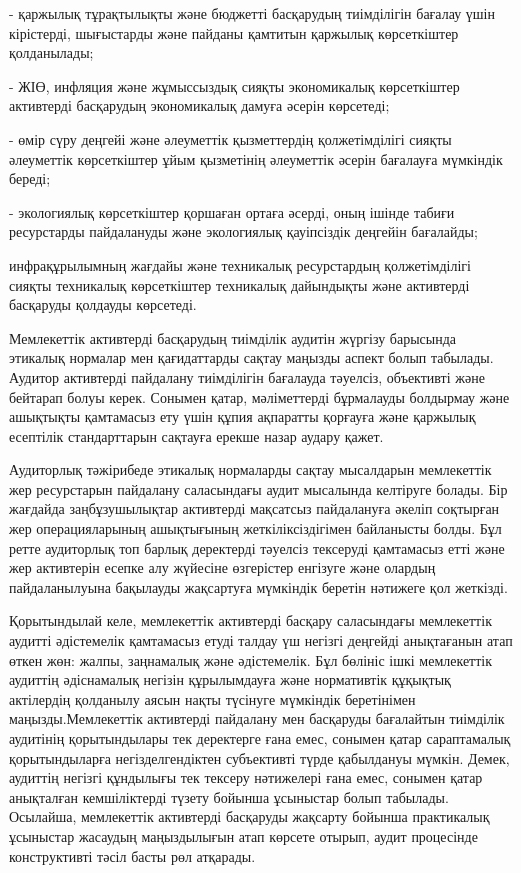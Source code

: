 - қаржылық тұрақтылықты және бюджетті басқарудың тиімділігін бағалау
үшін кірістерді, шығыстарды және пайданы қамтитын қаржылық көрсеткіштер
қолданылады;

- ЖІӨ, инфляция және жұмыссыздық сияқты экономикалық көрсеткіштер
активтерді басқарудың экономикалық дамуға әсерін көрсетеді;

- өмір сүру деңгейі және әлеуметтік қызметтердің қолжетімділігі сияқты
әлеуметтік көрсеткіштер ұйым қызметінің әлеуметтік әсерін бағалауға
мүмкіндік береді;

- экологиялық көрсеткіштер қоршаған ортаға әсерді, оның ішінде табиғи
ресурстарды пайдалануды және экологиялық қауіпсіздік деңгейін бағалайды;

инфрақұрылымның жағдайы және техникалық ресурстардың қолжетімділігі
сияқты техникалық көрсеткіштер техникалық дайындықты және активтерді
басқаруды қолдауды көрсетеді.

Мемлекеттік активтерді басқарудың тиімділік аудитін жүргізу барысында
этикалық нормалар мен қағидаттарды сақтау маңызды аспект болып табылады.
Аудитор активтерді пайдалану тиімділігін бағалауда тәуелсіз, объективті
және бейтарап болуы керек. Сонымен қатар, мәліметтерді бұрмалауды
болдырмау және ашықтықты қамтамасыз ету үшін құпия ақпаратты қорғауға
және қаржылық есептілік стандарттарын сақтауға ерекше назар аудару
қажет.

Аудиторлық тәжірибеде этикалық нормаларды сақтау мысалдарын мемлекеттік
жер ресурстарын пайдалану саласындағы аудит мысалында келтіруге болады.
Бір жағдайда заңбұзушылықтар активтерді мақсатсыз пайдалануға әкеліп
соқтырған жер операцияларының ашықтығының жеткіліксіздігімен байланысты
болды. Бұл ретте аудиторлық топ барлық деректерді тәуелсіз тексеруді
қамтамасыз етті және жер активтерін есепке алу жүйесіне өзгерістер
енгізуге және олардың пайдаланылуына бақылауды жақсартуға мүмкіндік
беретін нәтижеге қол жеткізді.

Қорытындылай келе, мемлекеттік активтерді басқару саласындағы
мемлекеттік аудитті әдістемелік қамтамасыз етуді талдау үш негізгі
деңгейді анықтағанын атап өткен жөн: жалпы, заңнамалық және әдістемелік.
Бұл бөлініс ішкі мемлекеттік аудиттің әдіснамалық негізін құрылымдауға
және нормативтік құқықтық актілердің қолданылу аясын нақты түсінуге
мүмкіндік беретінімен маңызды.Мемлекеттік активтерді пайдалану мен
басқаруды бағалайтын тиімділік аудитінің қорытындылары тек деректерге
ғана емес, сонымен қатар сараптамалық қорытындыларға негізделгендіктен
субъективті түрде қабылдануы мүмкін. Демек, аудиттің негізгі құндылығы
тек тексеру нәтижелері ғана емес, сонымен қатар анықталған кемшіліктерді
түзету бойынша ұсыныстар болып табылады. Осылайша, мемлекеттік
активтерді басқаруды жақсарту бойынша практикалық ұсыныстар жасаудың
маңыздылығын атап көрсете отырып, аудит процесінде конструктивті тәсіл
басты рөл атқарады.

